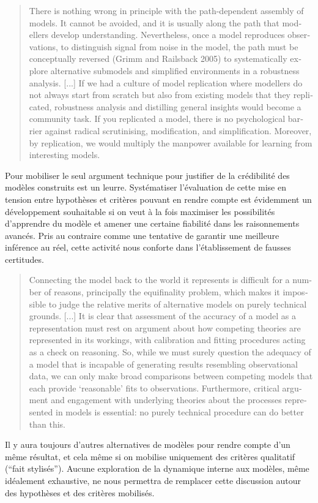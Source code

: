 \foreignblockquote{english}[\cite{Thiele2015}]{There is nothing wrong in principle with the path-dependent assembly of models. It cannot be avoided, and it is usually along the path that modellers develop understanding. Nevertheless, once a model reproduces observations, to distinguish signal from noise in the model, the path must be conceptually reversed (Grimm and Railsback 2005) to systematically explore alternative submodels and simplified environments in a robustness analysis. [...] If we had a culture of model replication where modellers do not always start from scratch but also from existing models that they replicated, robustness analysis and distilling general insights would become a community task. If you replicated a model, there is no psychological barrier against radical scrutinising, modification, and simplification. Moreover, by replication, we would multiply the manpower available for learning from interesting models.}

Pour \textcite{OSullivan2004} mobiliser le seul argument technique pour justifier de la crédibilité des modèles construits est un leurre. Systématiser l'évaluation de cette mise en tension entre hypothèses et critères pouvant en rendre compte est évidemment un développement souhaitable si on veut à la fois maximiser les possibilités d'apprendre du modèle et amener une certaine fiabilité dans les raisonnements avancés. Pris au contraire comme une tentative de garantir une meilleure inférence au réel, cette activité nous conforte dans l'établissement de fausses certitudes. 

\foreignblockquote{english}[\cite{OSullivan2004}]{Connecting the model back to the world it represents is difficult for a number of reasons, principally the equifinality problem, which makes it impossible to judge the relative merits of alternative models on purely technical grounds. [...] It is clear that assessment of the accuracy of a model as a representation must rest on argument about how competing theories are represented in its workings, with calibration and fitting procedures acting as a check on reasoning. So, while we must surely question the adequacy of a model that is incapable of generating results resembling observational data, we can only make broad comparisons between competing models that each provide ‘reasonable’ fits to observations. Furthermore, critical argument and engagement with underlying theories about the processes represented in models is essential: no purely technical procedure can do better than this.}

Il y aura toujours d'autres alternatives de modèles pour rendre compte d'un même résultat, et cela même si on mobilise uniquement des critères qualitatif (\enquote{fait stylisés}). Aucune exploration de la dynamique interne aux modèles, même idéalement exhaustive, ne nous permettra de remplacer cette discussion autour des hypothèses et des critères mobilisés.

